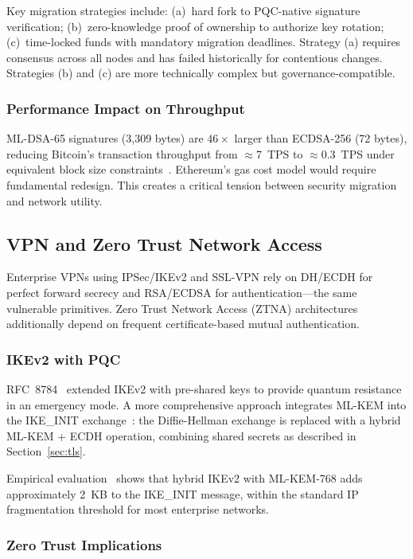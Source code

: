\documentclass[journal]{IEEEtran}
\begin{document}
Key migration strategies include: (a)~hard fork to PQC-native signature
verification; (b)~zero-knowledge proof of ownership to authorize key rotation;
(c)~time-locked funds with mandatory migration deadlines. Strategy (a) requires
consensus across all nodes and has failed historically for contentious changes.
Strategies (b) and (c) are more technically complex but governance-compatible.

\subsubsection{Performance Impact on Throughput}

ML-DSA-65 signatures (3,309 bytes) are $46\times$ larger than ECDSA-256 (72 bytes),
reducing Bitcoin's transaction throughput from $\approx$7~TPS to $\approx$0.3~TPS
under equivalent block size constraints~\cite{chen2021blockchain}. Ethereum's
gas cost model would require fundamental redesign. This creates a critical
tension between security migration and network utility.

\subsection{VPN and Zero Trust Network Access}
\label{sec:vpn}

Enterprise VPNs using IPSec/IKEv2 and SSL-VPN rely on DH/ECDH for perfect
forward secrecy and RSA/ECDSA for authentication---the same vulnerable
primitives. Zero Trust Network Access (ZTNA) architectures additionally depend
on frequent certificate-based mutual authentication.

\subsubsection{IKEv2 with PQC}

RFC~8784~\cite{rfc8784} extended IKEv2 with pre-shared keys to provide
quantum resistance in an emergency mode. A more comprehensive approach
integrates ML-KEM into the IKE\_INIT exchange~\cite{kampanakis2016post}:
the Diffie-Hellman exchange is replaced with a hybrid ML-KEM + ECDH operation,
combining shared secrets as described in Section~\ref{sec:tls}.

Empirical evaluation~\cite{sikeridis2020pqc} shows that hybrid IKEv2 with
ML-KEM-768 adds approximately 2~KB to the IKE\_INIT message, within the
standard IP fragmentation threshold for most enterprise networks.

\subsubsection{Zero Trust Implications}
\end{document}
